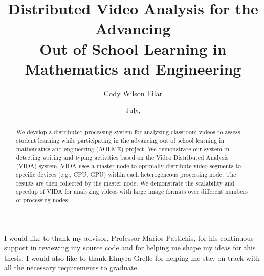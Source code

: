 \documentclass[botnum, fleqn]{unmeethesis}
\begin{document}
  \frontmatter




  \title{Distributed Video Analysis  for the  Advancing  \\
  Out of School Learning in Mathematics and Engineering}

  \author{Cody Wilson Eilar}





  \date{July, \thisyear}

  \maketitle



  \begin{acknowledgments}
    \vspace{1.1in}
    I would like to thank my advisor, Professor Marios Pattichis, for his continuous
    support in reviewing my source code and for helping me shape my ideas for this thesis.
    I would also like to thank
    Elmyra Grelle for helping me stay on track with all the necessary requirements
    to graduate.
  \end{acknowledgments}

  \maketitleabstract %

  \begin{abstract}
    We develop a distributed processing system for analyzing classroom videos to assess student learning while participating in the advancing out of school learning in mathematics and 
engineering (AOLME) project. We demonstrate our system in detecting writing and typing activities based on the Video Distributed Analysis (VIDA) system. VIDA uses a master node to 
optimally distribute video segments to specific devices (e.g., CPU, GPU) within each heterogeneous processing node. The results are then collected by the master node. We 
demonstrate the scalability and speedup of VIDA for analyzing videos with large image formats over different numbers of processing nodes.
    \clearpage %
  \end{abstract}
\end{document}
